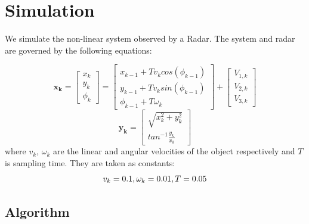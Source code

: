 \documentclass[a4paper,11pt]{article}
\theoremstyle{mytheor}
\begin{document}
\section*{Simulation}
We simulate the non-linear system observed by a Radar. The system and radar are governed by the following equations: 

\begin{equation}
    \boldsymbol{x_k} = 
    \begin{bmatrix}
    x_k\\
    y_k\\
    \phi_k
    \end{bmatrix} = 
    \begin{bmatrix}
    x_{k-1} + T v_k cos(\phi_{k-1}) \\
    y_{k-1} + T v_k sin(\phi_{k-1}) \\
    \phi_{k-1} + T\omega_k
    \end{bmatrix} + 
    \begin{bmatrix}
    V_{1, k}\\
    V_{2, k}\\
    V_{3, k}
    \end{bmatrix}
\end{equation}
\begin{equation}
    \boldsymbol{y_k} = 
    \begin{bmatrix}
    \sqrt{x_k^2+y_k^2}\\
    tan^{-1}\frac{y_k}{x_k}
    \end{bmatrix}
\end{equation}
where $v_k$, $\omega_k$ are the linear and angular velocities of the object respectively and $T$ is sampling time. They are taken as constants: 
\begin{equation*}
    v_k = 0.1, \\ \omega_k = 0.01, \\ T = 0.05
\end{equation*}
\subsection*{Algorithm}
\end{document}
